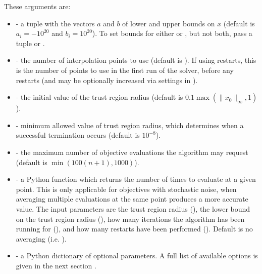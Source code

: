 \documentclass[letterpaper,10pt,english]{sphinxmanual}
\begin{document}
These arguments are:
\begin{itemize}
\item {} 
 - a tuple  with the vectors \(a\) and \(b\) of lower and upper bounds on \(x\) (default is \(a_i=-10^{20}\) and \(b_i=10^{20}\)). To set bounds for either  or , but not both, pass a tuple  or .

\item {} 
 - the number of interpolation points to use (default is ). If using restarts, this is the number of points to use in the first run of the solver, before any restarts (and may be optionally increased via settings in ).

\item {} 
 - the initial value of the trust region radius (default is \(0.1\max(\|x_0\|_{\infty}, 1)\)).

\item {} 
 - minimum allowed value of trust region radius, which determines when a successful termination occurs (default is \(10^{-8}\)).

\item {} 
 - the maximum number of objective evaluations the algorithm may request (default is \(\min(100(n+1),1000)\)).

\item {} 
 - a Python function  which returns the number of times to evaluate  at a given point. This is only applicable for objectives with stochastic noise, when averaging multiple evaluations at the same point produces a more accurate value. The input parameters are the trust region radius (), the lower bound on the trust region radius (), how many iterations the algorithm has been running for (), and how many restarts have been performed (). Default is no averaging (i.e. ).

\item {} 
 - a Python dictionary  of optional parameters. A full list of available options is given in the next section {\hyperref[\detokenize{advanced::doc}]{}}.


\end{itemize}
\end{document}
